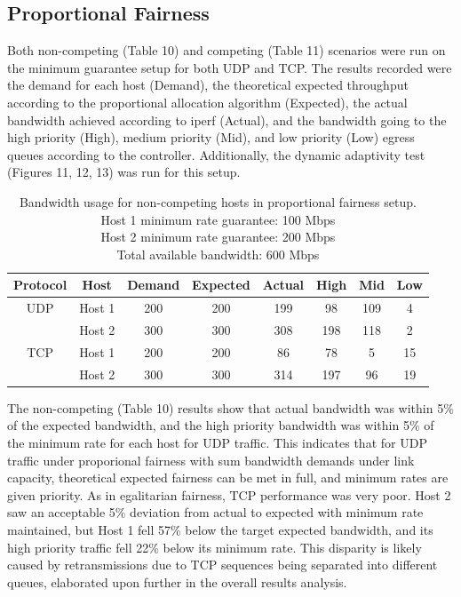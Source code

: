 \documentclass[accepted,single]{gipaper}
\begin{document}
\subsection{Proportional Fairness}
\label{dba_prop}

Both non-competing (Table 10) and competing (Table 11) scenarios were run on the minimum guarantee setup for both UDP and TCP. The results recorded were the demand for each host (Demand), the theoretical expected throughput according to the proportional allocation algorithm (Expected), the actual bandwidth achieved according to iperf (Actual), and the bandwidth going to the high priority (High), medium priority (Mid), and low priority (Low) egress queues according to the controller. Additionally, the dynamic adaptivity test (Figures 11, 12, 13) was run for this setup.

\begin{table}[h]
	\label{prop_nc}
	\vspace{-2mm}
	\begin{center}
		\begin{small}
		\setlength\tabcolsep{1.5pt}
			\begin{tabular}{cccccccc}
				Protocol & Host & Demand & Expected & Actual & High & Mid & Low\\
				\hline
				UDP & Host 1 & 200 & 200 & 199 & 98 & 109 & 4\\
				    & Host 2 & 300 & 300 & 308 & 198 & 118 & 2\\
				\hline
				TCP & Host 1 & 200 & 200 & 86 & 78 & 5 & 15\\
				    & Host 2 & 300 & 300 & 314 & 197 & 96 & 19\\
			\end{tabular}
		\end{small}
	\end{center}
	\caption{Bandwidth usage for non-competing hosts in proportional fairness setup.\\
	Host 1 minimum rate guarantee: 100 Mbps\\
	Host 2 minimum rate guarantee: 200 Mbps\\	
	Total available bandwidth: 600 Mbps}
	\vspace{-3mm}
\end{table}

The non-competing (Table 10) results show that actual bandwidth was within 5\% of the expected bandwidth, and the high priority bandwidth was within 5\% of the minimum rate for each host for UDP traffic. This indicates that for UDP traffic under proporional fairness with sum bandwidth demands under link capacity, theoretical expected fairness can be met in full, and minimum rates are given priority. As in egalitarian fairness, TCP performance was very poor. Host 2 saw an acceptable 5\% deviation from actual to expected with minimum rate maintained, but Host 1 fell 57\% below the target expected bandwidth, and its high priority traffic fell 22\% below its minimum rate. This disparity is likely caused by retransmissions due to TCP sequences being separated into different queues, elaborated upon further in the overall results analysis.
\end{document}
